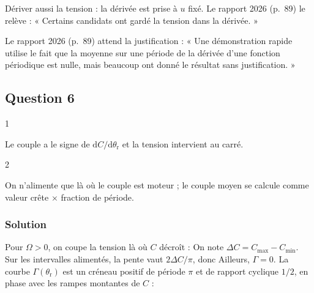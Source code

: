 \documentclass[11pt,a4paper]{article}
\newcommand{\equationajustee}[1]{%
  \sbox{\boiteequation}{$\displaystyle #1$}%
  \ifdim\wd\boiteequation>\linewidth
    \[\resizebox{\linewidth}{!}{\usebox{\boiteequation}}\]%
  \else
    \[#1\]%
  \fi}
\begin{document}
\begin{piege}

Dériver aussi la tension : la dérivée est prise à \(u\) fixé. Le rapport 2026 (p.~89) le relève : « Certains candidats ont gardé la tension dans la dérivée. »

\end{piege}

\begin{jury}

Le rapport 2026 (p.~89) attend la justification : « Une démonstration rapide utilise le fait que la moyenne sur une période de la dérivée d'une fonction périodique est nulle, mais beaucoup ont donné le résultat sans justification. »

\end{jury}

\hypertarget{question-6}{%
\subsection{Question 6}\label{question-6}}

\begin{indication}{1}

Le couple a le signe de \(\mathrm dC/\mathrm d\theta_{\mathrm r}\) et la tension intervient au carré.

\end{indication}

\begin{indication}{2}

On n'alimente que là où le couple est moteur ; le couple moyen se calcule comme valeur crête × fraction de période.

\end{indication}

\hypertarget{solution-5}{%
\subsubsection{Solution}\label{solution-5}}

Pour \(\Omega>0\), on coupe la tension là où \(C\) décroît :
\equationajustee{\boxed{\begin{aligned}{}&u=U\ \text{sur}\ \Big]k\pi,\ k\pi+\frac{\pi}{2}\Big[\\
&u=0\ \text{sur}\ \Big]k\pi+\frac{\pi}{2},\ (k+1)\pi\Big[
\end{aligned}}}
On note \(\Delta C=C_{\max}-C_{\min}\). Sur les intervalles alimentés, la pente vaut \(2\Delta C/\pi\), donc
\equationajustee{\Gamma=\frac{U^2(C_{\max}-C_{\min})}{\pi}}
Ailleurs, \(\Gamma=0\). La courbe \(\Gamma(\theta_{\mathrm r})\) est un créneau positif de période \(\pi\) et de rapport cyclique \(1/2\), en phase avec les rampes montantes de \(C\) :
\end{document}
